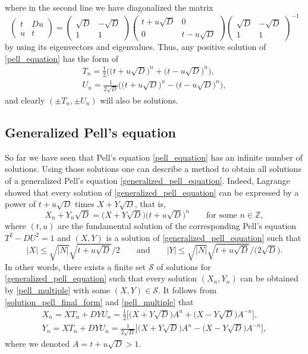 \documentclass[pdftex]{sigma}
\numberwithin{equation}{section}
\begin{document}
where in the second line we have diagonalized the matrix
\[
\begin{pmatrix}
	t&Du\\
	u&t
\end{pmatrix}=\begin{pmatrix}
	\sqrt{D}&-\sqrt{D}\\
	1&1
\end{pmatrix}\begin{pmatrix}
	t+u\sqrt{D}&0\\
	0&t-u\sqrt{D}
\end{pmatrix}\begin{pmatrix}
	\sqrt{D}&-\sqrt{D}\\
	1&1
\end{pmatrix}^{-1}
\]
by using its eigenvectors and eigenvalues. Thus, any positive solution of \eqref{pell_equation} has the form of
\begin{gather}
		T_n =\frac{1}{2}\big(\big(t+u\sqrt{D}\big)^n+\big(t-u\sqrt{D}\big)^n\big),\nonumber\\
		U_n =\frac{1}{2\sqrt{D}}\big(\big(t+u\sqrt{D}\big)^n-\big(t-u\sqrt{D}\big)^n\big),\label{solution_pell_final_form}
	\end{gather}
and clearly $ (\pm T_n, \pm U_n) $ will also be solutions.

\subsection{Generalized Pell's equation}
So far we have seen that Pell's equation \eqref{pell_equation} has an infinite number of solutions. Using those solutions one can describe a method to obtain all solutions of a generalized Pell's equation \eqref{generalized_pell_equation}. Indeed, Lagrange showed that every solution of \eqref{generalized_pell_equation} can be expressed by a power of $ t+u\sqrt{D} $ times $ X+Y\sqrt{D} $, that is,
\begin{equation}\label{pell_multiple}
	X_n+Y_n\sqrt{D}=\big(X+Y\sqrt{D}\big)\big(t+u\sqrt{D}\big)^n\qquad \text{for some } n\in \mathbb{Z},
\end{equation}
where $ (t,u) $ are the fundamental solution of the corresponding Pell's equation $ T^2-DU^2=1 $ and $ (X,Y) $ is a solution of \eqref{generalized_pell_equation} such that
\[
	|X|\leq \sqrt{|N|} \sqrt{t+u\sqrt{D}} /2 \qquad\text{and}\qquad |Y|\leq \sqrt{|N|} \sqrt{t+u\sqrt{D}} /\big(2\sqrt{D}\big).
\]
In other words, there exists a finite set $ \mathcal{S} $ of solutions for \eqref{generalized_pell_equation} such that every solution $ (X_n,Y_n) $ can be obtained by \eqref{pell_multiple} with some $ (X,Y)\in \mathcal{S} $. It follows from \eqref{solution_pell_final_form} and \eqref{pell_multiple} that
\begin{gather}
		X_n =XT_n+DYU_n=\frac{1}{2}\big[\big(X+Y\sqrt{D}\big)A^n+\big(X-Y\sqrt{D}\big)A^{-n}\big],\nonumber\\
		Y_n =XT_n+DYU_n=\frac{1}{2\sqrt{D}}\big[\big(X+Y\sqrt{D}\big)A^n-\big(X-Y\sqrt{D}\big)A^{-n}\big],\label{generalized_Pell_solution_format}
	\end{gather}
where we denoted $ A=t+u\sqrt{D}>1 $.
\end{document}

